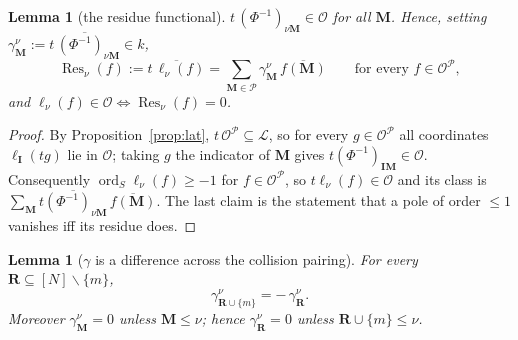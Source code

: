 \documentclass[11pt]{article}
\newtheorem{lem}[thm]{Lemma}
\theoremstyle{definition}
\newcommand{\bM}{\mathbf{M}}
\newcommand{\bI}{\mathbf{I}}
\newcommand{\bR}{\mathbf{R}}
\newcommand{\sm}{\smallsetminus}
\newcommand{\ord}{\operatorname{ord}}
\newcommand{\Lat}{\mathcal{L}}
\begin{document}
\begin{lem}[the residue functional]\label{lem:resfun}
$t\,(\Phi^{-1})_{\nu\bM}\in\mathcal{O}$ for all $\bM$.  Hence, setting
$\gamma^{\nu}_{\bM}:=\overline{t\,(\Phi^{-1})_{\nu\bM}}\in k$,
\[
  \operatorname{Res}_\nu(f):=\overline{t\,\ell_\nu(f)}
  =\sum_{\bM\in\mathcal{P}}\gamma^{\nu}_{\bM}\,\overline{f(\bM)}
  \qquad\text{for every }f\in\mathcal{O}^{\mathcal{P}},
\]
and $\ell_\nu(f)\in\mathcal{O}\iff\operatorname{Res}_\nu(f)=0$.
\end{lem}

\begin{proof}
By Proposition~\ref{prop:lat}, $t\,\mathcal{O}^{\mathcal{P}}\subseteq\Lat$, so
for every $g\in\mathcal{O}^{\mathcal{P}}$ all coordinates $\ell_\bI(tg)$ lie in
$\mathcal{O}$; taking $g$ the indicator of $\bM$ gives
$t(\Phi^{-1})_{\bI\bM}\in\mathcal{O}$.  Consequently $\ord_S\ell_\nu(f)\ge-1$ for
$f\in\mathcal{O}^{\mathcal{P}}$, so $t\ell_\nu(f)\in\mathcal{O}$ and its class is
$\sum_\bM\overline{t(\Phi^{-1})_{\nu\bM}}\,\overline{f(\bM)}$.  The last claim is
the statement that a pole of order $\le1$ vanishes iff its residue does.
\end{proof}

\begin{lem}[$\gamma$ is a difference across the collision pairing]\label{lem:gamma}
For every $\bR\subseteq[N]\sm\{m\}$,
\[
  \gamma^{\nu}_{\bR\cup\{m\}}=-\,\gamma^{\nu}_{\bR}.
\]
Moreover $\gamma^{\nu}_{\bM}=0$ unless $\bM\le\nu$; hence $\gamma^{\nu}_{\bR}=0$
unless $\bR\cup\{m\}\le\nu$.
\end{lem}
\end{document}
